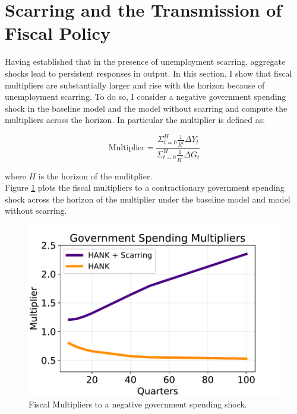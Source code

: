 \section{Scarring and the Transmission of Fiscal Policy}

Having established that in the presence of unemployment scarring, aggregate shocks lead to persistent responses in output. In this section, I show that fiscal multipliers are substantially larger and rise with the horizon because of unemployment scarring. To do so, I consider a negative government spending shock in the baseline model and the model without scarring and compute the multipliers across the horizon. In particular the multiplier is defined as:



$$ \text{Multiplier} = \frac{\Sigma_{t=0}^{H}  \frac{1}{R^{t}}\Delta Y_{t}}{ \Sigma_{t=0}^{H}  \frac{1}{R^{t}}\Delta{G_{t}}}$$ 

where $H$ is the horizon of the mulitplier. \\

Figure \ref{Fiscal_multipliers} plots the fiscal multipliers to a contractionary government spending shock across the horizon of the multiplier under the baseline model and model without scarring.


\begin{figure}[!h]
    \centering
   \begin{minipage}{0.68\textwidth}
        \centering
        \includegraphics[scale=.7]{text/chapter1/Figures/multipliers} %
    \end{minipage}
        \caption{Fiscal Multipliers to a negative government spending shock.}
    \label{Fiscal_multipliers}
\end{figure}


